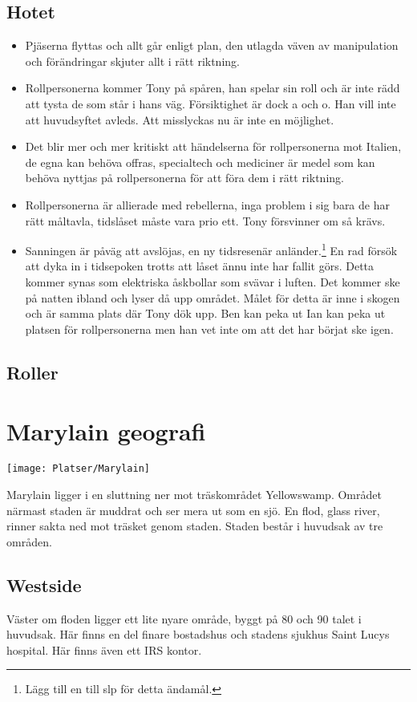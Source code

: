 \documentclass[a5paper,10pt]{report}
\begin{document}
\subsection{Hotet}
\begin{itemize}
  \item[Låg] Pjäserna flyttas och allt går enligt plan, den utlagda väven av manipulation och förändringar skjuter allt i rätt riktning.
  \item[1:a växeln] Rollpersonerna kommer Tony på spåren, han spelar sin roll och är inte rädd att tysta de som står i hans väg. Försiktighet är dock a och o. Han vill inte att huvudsyftet avleds. Att misslyckas nu är inte en möjlighet.
  \item[2:a växeln] Det blir mer och mer kritiskt att händelserna för rollpersonerna mot Italien, de egna kan behöva offras, specialtech och mediciner är medel som kan behöva nyttjas på rollpersonerna för att föra dem i rätt riktning.
  \item[3:e växeln] Rollpersonerna är allierade med rebellerna, inga problem i sig bara de har rätt måltavla, tidslåset måste vara prio ett. Tony försvinner om så krävs.
  \item[Overdrive] Sanningen är påväg att avslöjas, en ny tidsresenär anländer.\footnote{Lägg till en till slp för detta ändamål.} En rad försök att dyka in i tidsepoken trotts att låset ännu inte har fallit görs. Detta kommer synas som elektriska åskbollar som svävar i luften. Det kommer ske på natten ibland och lyser då upp området. Målet för detta är inne i skogen och är samma plats där Tony dök upp. Ben kan peka ut Ian kan peka ut platsen för rollpersonerna men han vet inte om att det har börjat ske igen.
\end{itemize}
\subsection{Roller}


\section{Marylain geografi}
\texttt{[image: Platser/Marylain]}

Marylain ligger i en sluttning ner mot träskområdet Yellowswamp. Området närmast staden är muddrat och ser mera ut som en sjö. En flod, glass river, rinner sakta ned mot träsket genom staden. Staden består i huvudsak av tre områden.
\subsection{Westside}
Väster om floden ligger ett lite nyare område, byggt på 80 och 90 talet i huvudsak. Här finns en del finare bostadshus och stadens sjukhus Saint Lucys hospital. Här finns även ett IRS kontor.
\end{document}
